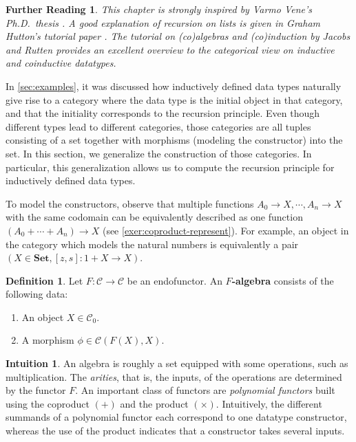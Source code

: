 \documentclass[a4paper,11pt, oneside,titlepage=false]{scrbook}
\theoremstyle{plain}
\newtheorem*{reading*}{Further Reading}
\theoremstyle{definition}
\newtheorem{dfn}[thm]{Definition}
\newtheorem{intu}[thm]{Intuition}
\newcommand{\Cat}[1]{\mathcal{#1}}
\newcommand{\CC}{\Cat{C}}
\newcommand{\Catb}[1]{\mathbf{#1}}
\newcommand{\SET}{\Catb{Set}}
\newcommand{\Ob}[1]{{#1}_0}
\newcommand{\CHom}[3]{{#1}(#2,#3)}
\begin{document}
\begin{reading*}
  This chapter is strongly inspired by Varmo Vene's Ph.D.\ thesis \cite[Chapter 2]{vene_phd}.
  A good explanation of recursion on lists is given in Graham Hutton's tutorial paper \cite{DBLP:journals/jfp/Hutton99}.
  The tutorial on (co)algebras and (co)induction by Jacobs and Rutten \cite{jacobs-rutten-tutorial} provides an excellent overview to the categorical view on inductive and coinductive datatypes.
\end{reading*}

In \cref{sec:examples}, it was discussed how inductively defined data types naturally give rise to a category where the data type is the initial object in that category, and that the initiality corresponds to the recursion principle.
Even though different types lead to different categories, those categories are all tuples consisting of a set together with morphisms (modeling the constructor) into the set.
In this section, we generalize the construction of those categories.
In particular, this generalization allows us to compute the recursion principle for inductively defined data types.

To model the constructors, observe that multiple functions $A_0 \to X, \cdots, A_n \to X$ with the same codomain can be equivalently described as one function $(A_0 + \cdots + A_n) \to X$ (see \cref{exer:coproduct-represent}).
For example, an object in the category which models the natural numbers is equivalently a pair $(X \in \SET, [z,s] : 1 + X \to X)$.


\begin{dfn} Let $F:\CC\to \CC$ be an endofunctor. An \textbf{$F$-algebra} consists of the following data:
\begin{enumerate}
\item An object $X\in \Ob \CC$.
\item A morphism $\phi \in \CHom{\CC}{F(X)}{X}$.
\end{enumerate}
\end{dfn}

\begin{intu}
An algebra is roughly a set equipped with some operations, such as multiplication.
The \emph{arities}, that is, the inputs, of the operations are determined by the functor $F$.
An important class of functors are \emph{polynomial functors} built using the coproduct $(+)$ and the product $(\times)$.
Intuitively, the different summands of a polynomial functor each correspond to one datatype constructor, whereas the use of the product indicates that a constructor takes several inputs.
\end{intu}
\end{document}
